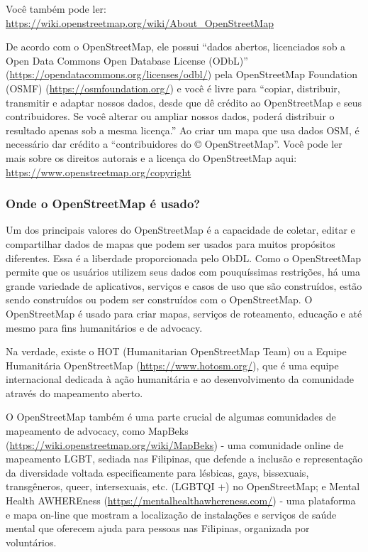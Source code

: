 \documentclass[
]{book}
\begin{document}
Você também pode ler: \url{https://wiki.openstreetmap.org/wiki/About_OpenStreetMap}

De acordo com o OpenStreetMap, ele possui ``dados abertos, licenciados sob a Open Data Commons Open Database License (ODbL)'' (\url{https://opendatacommons.org/licenses/odbl/}) pela OpenStreetMap Foundation (OSMF) (\url{https://osmfoundation.org/}) e você é livre para ``copiar, distribuir, transmitir e adaptar nossos dados, desde que dê crédito ao OpenStreetMap e seus contribuidores. Se você alterar ou ampliar nossos dados, poderá distribuir o resultado apenas sob a mesma licença.'' Ao criar um mapa que usa dados OSM, é necessário dar crédito a ``contribuidores do © OpenStreetMap''. Você pode ler mais sobre os direitos autorais e a licença do OpenStreetMap aqui: \url{https://www.openstreetmap.org/copyright}

\hypertarget{onde-o-openstreetmap-uxe9-usado}{%
\subsubsection{\texorpdfstring{\textbf{Onde o OpenStreetMap é usado?}}{Onde o OpenStreetMap é usado?}}\label{onde-o-openstreetmap-uxe9-usado}}

Um dos principais valores do OpenStreetMap é a capacidade de coletar, editar e compartilhar dados de mapas que podem ser usados para muitos propósitos diferentes. Essa é a liberdade proporcionada pelo ObDL. Como o OpenStreetMap permite que os usuários utilizem seus dados com pouquíssimas restrições, há uma grande variedade de aplicativos, serviços e casos de uso que são construídos, estão sendo construídos ou podem ser construídos com o OpenStreetMap. O OpenStreetMap é usado para criar mapas, serviços de roteamento, educação e até mesmo para fins humanitários e de advocacy.

Na verdade, existe o HOT (Humanitarian OpenStreetMap Team) ou a Equipe Humanitária OpenStreetMap (\url{https://www.hotosm.org/}), que é uma equipe internacional dedicada à ação humanitária e ao desenvolvimento da comunidade através do mapeamento aberto.

O OpenStreetMap também é uma parte crucial de algumas comunidades de mapeamento de advocacy, como MapBeks (\url{https://wiki.openstreetmap.org/wiki/MapBeks}) - uma comunidade online de mapeamento LGBT, sediada nas Filipinas, que defende a inclusão e representação da diversidade voltada especificamente para lésbicas, gays, bissexuais, transgêneros, queer, intersexuais, etc. (LGBTQI +) no OpenStreetMap; e Mental Health AWHEREness (\url{https://mentalhealthawhereness.com/}) - uma plataforma e mapa on-line que mostram a localização de instalações e serviços de saúde mental que oferecem ajuda para pessoas nas Filipinas, organizada por voluntários.
\end{document}
